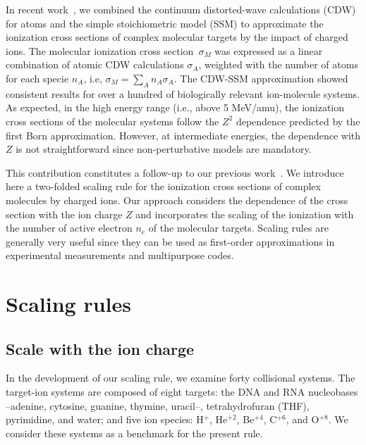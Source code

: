\documentclass[10pt,showpacs,showkeys,twocolumn]{revtex4-1}
\begin{document}
In recent work~\cite{MendezJPB20}, we combined the continuum 
distorted-wave calculations (CDW) for atoms and the simple 
stoichiometric model (SSM) to approximate the ionization cross 
sections of complex molecular targets by the impact of charged ions. 
The molecular ionization cross section~$\sigma_M$ was expressed as 
a linear combination of atomic CDW calculations $\sigma_A$, 
weighted with the number of atoms for each specie $n_A$, i.e, 
$\sigma_M=\sum_A n_A \sigma_A$. The CDW-SSM approximation showed 
consistent results for over a hundred of biologically relevant 
ion-molecule systems. As expected, in the high energy range (i.e., 
above 5 MeV/amu), the ionization cross sections of 
the molecular systems follow the $Z^2$ dependence predicted by the 
first Born approximation. However, at intermediate 
energies, the dependence with $Z$ is not straightforward since 
non-perturbative models are mandatory.

This contribution constitutes a follow-up to our previous 
work~\cite{MendezJPB20}. We introduce here a two-folded scaling rule 
for the ionization cross sections of complex molecules by charged ions. 
Our approach considers the dependence of the cross section with the ion 
charge $Z$ and incorporates the scaling of the ionization with the 
number of active electron $n_e$ of the molecular targets. Scaling rules 
are generally very useful since they can be used as first-order 
approximations in experimental measurements and multipurpose codes. 

\section{Scaling rules}

\subsection{Scale with the ion charge}
\label{sec:zscaling}

In the development of our scaling rule, we examine forty collisional 
systems. The target-ion systems are composed of eight targets: 
the DNA and RNA nucleobases --adenine, cytosine, guanine, thymine, 
uracil--, tetrahydrofuran (THF), pyrimidine, and water; and five ion 
species: H$^+$, He$^{+2}$, Be$^{+4}$, C$^{+6}$, and O$^{+8}$. 
We consider these systems as a benchmark for the present rule. 
\end{document}
